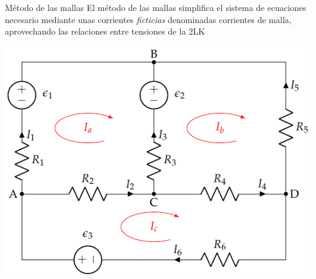 \documentclass[aspectratio=169, xcolor={usenames,svgnames,dvipsnames}]{beamer}
\begin{document}
\begin{frame}{Método de las mallas}
El método de las mallas simplifica el sistema de ecuaciones necesario mediante unas corrientes \emph{ficticias} denominadas \alert{corrientes de malla}, aprovechando las relaciones entre tensiones de la 2LK

\begin{center}
\includegraphics[height=0.7\textheight]{../figs/mallas1_corrientes.pdf}
\end{center}
\end{frame}
\end{document}
